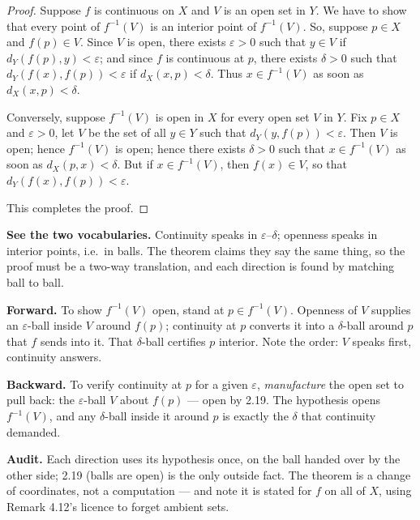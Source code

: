 \begin{proof}
Suppose $f$ is continuous on $X$ and $V$ is an open set in $Y$. We have to
show that every point of $f^{-1}(V)$ is an interior point of $f^{-1}(V)$. So,
suppose $p \in X$ and $f(p) \in V$. Since $V$ is open, there exists
$\varepsilon > 0$ such that $y \in V$ if $d_Y(f(p),y) < \varepsilon$; and
since $f$ is continuous at $p$, there exists $\delta > 0$ such that
$d_Y(f(x),f(p)) < \varepsilon$ if $d_X(x,p) < \delta$. Thus
$x \in f^{-1}(V)$ as soon as $d_X(x,p) < \delta$.

Conversely, suppose $f^{-1}(V)$ is open in $X$ for every open set $V$ in $Y$.
Fix $p \in X$ and $\varepsilon > 0$, let $V$ be the set of all $y \in Y$ such
that $d_Y(y,f(p)) < \varepsilon$. Then $V$ is open; hence $f^{-1}(V)$ is
open; hence there exists $\delta > 0$ such that $x \in f^{-1}(V)$ as soon as
$d_X(p,x) < \delta$. But if $x \in f^{-1}(V)$, then $f(x) \in V$, so that
$d_Y(f(x),f(p)) < \varepsilon$.

This completes the proof.
\end{proof}

\begin{proofwalk}
  \item \textbf{See the two vocabularies.} Continuity speaks in
        $\varepsilon$--$\delta$; openness speaks in interior points, i.e.\ in
        balls. The theorem claims they say the same thing, so the proof must
        be a two-way translation, and each direction is found by matching
        ball to ball.
  \item \textbf{Forward.} To show $f^{-1}(V)$ open, stand at $p \in
        f^{-1}(V)$. Openness of $V$ supplies an $\varepsilon$-ball inside $V$
        around $f(p)$; continuity at $p$ converts it into a $\delta$-ball
        around $p$ that $f$ sends into it. That $\delta$-ball certifies $p$
        interior. Note the order: $V$ speaks first, continuity answers.
  \item \textbf{Backward.} To verify continuity at $p$ for a given
        $\varepsilon$, \emph{manufacture} the open set to pull back: the
        $\varepsilon$-ball $V$ about $f(p)$ --- open by 2.19. The hypothesis
        opens $f^{-1}(V)$, and any $\delta$-ball inside it around $p$ is
        exactly the $\delta$ that continuity demanded.
  \item \textbf{Audit.} Each direction uses its hypothesis once, on the
        ball handed over by the other side; 2.19 (balls are open) is the only
        outside fact. The theorem is a change of coordinates, not a
        computation --- and note it is stated for $f$ on all of $X$, using
        Remark 4.12's licence to forget ambient sets.
\end{proofwalk}


